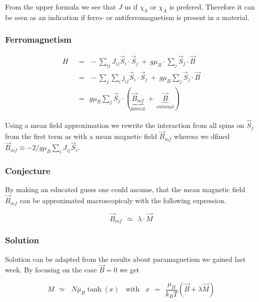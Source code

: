 \documentclass[10pt]{report}
\numberwithin{equation}{chapter}
\begin{document}
From the upper formula we see that $J$ us if $\chi_S$ or $\chi_A$ is prefered. Therefore it can be seen as an indication if ferro- or antiferromagnetism is present in a material.


\subsubsection{Ferromagnetism}

\begin{align}
  H ~~& =~~ - \sum_{ij} J_{ij} \vec{S}_i \cdot \vec{S}_j ~+~ g \mu_B \cdot \sum_j \vec{S}_j \cdot \vec{B}\nonumber \\  
      & =~~ - \sum_j \sum_i j_{ij} \vec{S}_i \cdot \vec{S}_j ~+~ g \mu_B \sum_j \vec{S}_j \cdot \vec{B}\nonumber \\
      & =~~ g \mu_B \sum_j \vec{S}_j \cdot ( \underbrace{\vec{B}_{mf}}_\text{interal} ~+~ \underbrace{\vec{B}}_\text{external})
\end{align}

Using a mean field approximation we rewrite the interaction from all spins on $\vec{S}_j$ from the first term as with a mean magnetic field $\vec{B}_{mf}$ wheresa we dfined $\vec{B}_{mf} \equiv -2/g \mu_B \sum_i J_{ij} \vec{S}_i$. 

\subsubsection{Conjecture}

By making an educated guess one could assume, that the mean magnetic field $\vec{B}_{mf}$ can be approximated macroscopicaly with the following expression.

\begin{equation}
  \vec{B}_{mf} ~~≃~~ \lambda \cdot \vec{M}
\end{equation}


\subsubsection{Solution}

Solution can be adapted from the results about paramagnetism we gained last week. By focusing on the case $\vec{B} = 0$ we get

\begin{equation} \label{eq:ferromag_graph_sol}
  M ~~≃~~~ N \mu_B \tanh(x) ~~~~ \text{with} ~~~~ x ~~=~~\frac{\mu_B}{k_BT} (\vec{B} + \lambda \vec{M})
\end{equation}
\end{document}
